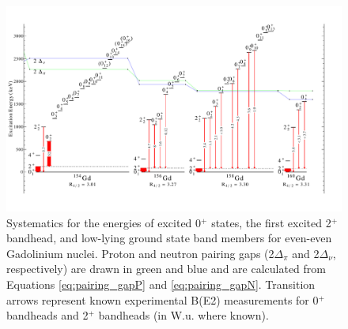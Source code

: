 
\begin{landscape}
\begin{figure}[ht] 
\begin{center}
\includegraphics[height=0.8\textheight]{SciDraw_GdSystematics.pdf}
\caption{Systematics for the energies of excited 0$^+$ states, the first excited 2$^+$ bandhead, and low-lying ground state band members for even-even Gadolinium nuclei. Proton and neutron pairing gaps (2$\Delta_\pi$ and 2$\Delta_\nu$, respectively) are drawn in green and blue and are calculated from Equations \ref{eq:pairing_gapP} and \ref{eq:pairing_gapN}. Transition arrows represent known experimental B(E2) measurements for 0$^+$ bandheads and 2$^+$ bandheads (in W.u. where known).
\label{fig:GdSystematics}}
\end{center}
\end{figure}
\end{landscape}


